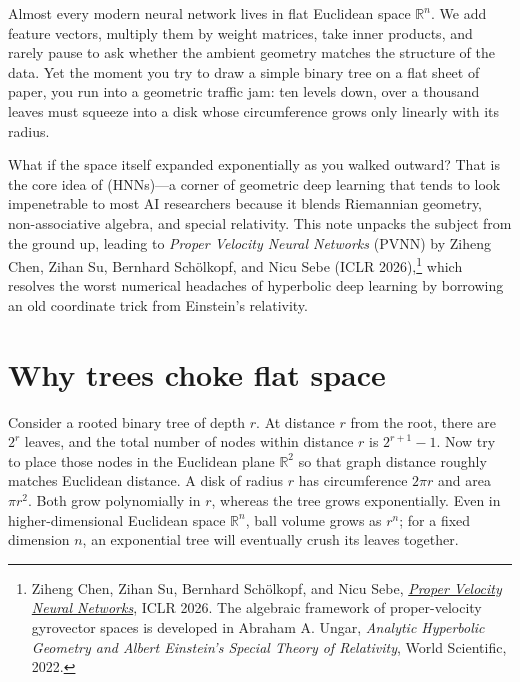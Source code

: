 
Almost every modern neural network lives in flat Euclidean space \(\mathbb{R}^n\). We add feature vectors, multiply them by weight matrices, take inner products, and rarely pause to ask whether the ambient geometry matches the structure of the data. Yet the moment you try to draw a simple binary tree on a flat sheet of paper, you run into a geometric traffic jam: ten levels down, over a thousand leaves must squeeze into a disk whose circumference grows only linearly with its radius.

What if the space itself expanded exponentially as you walked outward? That is the core idea of  (HNNs)---a corner of geometric deep learning that tends to look impenetrable to most AI researchers because it blends Riemannian geometry, non-associative algebra, and special relativity. This note unpacks the subject from the ground up, leading to \emph{Proper Velocity Neural Networks} (PVNN) by Ziheng Chen, Zihan Su, Bernhard Sch\"olkopf, and Nicu Sebe (ICLR 2026),\footnote{Ziheng Chen, Zihan Su, Bernhard Sch\"olkopf, and Nicu Sebe, \href{https://openreview.net/forum?id=UDIYU1X3vC}{\emph{Proper Velocity Neural Networks}}, ICLR 2026. The algebraic framework of proper-velocity gyrovector spaces is developed in Abraham A. Ungar, \emph{Analytic Hyperbolic Geometry and Albert Einstein's Special Theory of Relativity}, World Scientific, 2022.} which resolves the worst numerical headaches of hyperbolic deep learning by borrowing an old coordinate trick from Einstein's relativity.

\section{Why trees choke flat space}

Consider a rooted binary tree of depth \(r\). At distance \(r\) from the root, there are \(2^r\) leaves, and the total number of nodes within distance \(r\) is \(2^{r+1}-1\). Now try to place those nodes in the Euclidean plane \(\mathbb{R}^2\) so that graph distance roughly matches Euclidean distance. A disk of radius \(r\) has circumference \(2\pi r\) and area \(\pi r^2\). Both grow polynomially in \(r\), whereas the tree grows exponentially. Even in higher-dimensional Euclidean space \(\mathbb{R}^n\), ball volume grows as \(r^n\); for a fixed dimension \(n\), an exponential tree will eventually crush its leaves together.

